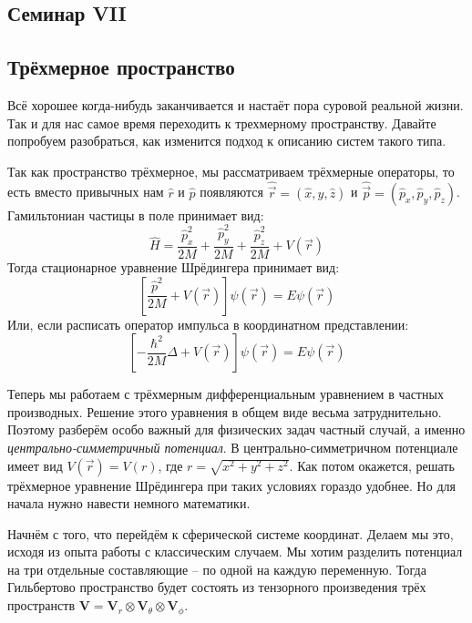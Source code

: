 \begin{center}
    \section{Семинар VII}
\end{center}
\subsection{Трёхмерное пространство}
\hspace{1em} Всё хорошее когда-нибудь заканчивается и настаёт пора суровой реальной жизни. Так и для нас самое время переходить к трехмерному пространству. Давайте попробуем разобраться, как изменится подход к описанию систем такого типа.

Так как пространство трёхмерное, мы рассматриваем трёхмерные операторы, то есть вместо привычных нам $\hat{r}$ и $\hat{p}$ появляются $\hat{\Vec{r}} = (\hat{x}, \hat{y}, \hat{z})$ и $\hat{\Vec{p}} = (\hat{p}_x, \hat{p}_y, \hat{p}_z)$. Гамильтониан частицы в поле принимает вид:
\[
\hat{H} = \frac{\hat{p}^2_x}{2M} + \frac{\hat{p}^2_y}{2M} + \frac{\hat{p}^2_z}{2M} + V(\Vec{r})
\]
Тогда стационарное уравнение Шрёдингера принимает вид:
\[
\left[\frac{\hat{p}^2}{2M} + V(\Vec{r})\right]\psi(\Vec{r}) = E\psi(\Vec{r})
\]
Или, если расписать оператор импульса в координатном представлении:
\[
\left[-\frac{\hbar^2}{2M}\Delta + V(\Vec{r})\right]\psi(\Vec{r}) = E\psi(\Vec{r})
\]

Теперь мы работаем с трёхмерным дифференциальным уравнением в частных производных. Решение этого уравнения в общем виде весьма затруднительно. Поэтому разберём особо важный для физических задач частный случай, а именно \textit{центрально-симметричный потенциал}. В центрально-симметричном потенциале имеет вид $V(\Vec{r}) = V(r)$, где $r = \sqrt{x^2 + y^2 + z^2}$. Как потом окажется, решать трёхмерное уравнение Шрёдингера при таких условиях гораздо удобнее. Но для начала нужно навести немного математики. 

Начнём с того, что перейдём к сферической системе координат. Делаем мы это, исходя из опыта работы с классическим случаем. Мы хотим разделить потенциал на три отдельные составляющие -- по одной на каждую переменную. Тогда Гильбертово пространство будет состоять из тензорного произведения трёх пространств $\mathbf{V} = \mathbf{V}_r \otimes \mathbf{V}_{\theta} \otimes \mathbf{V}_{\phi}$. 

